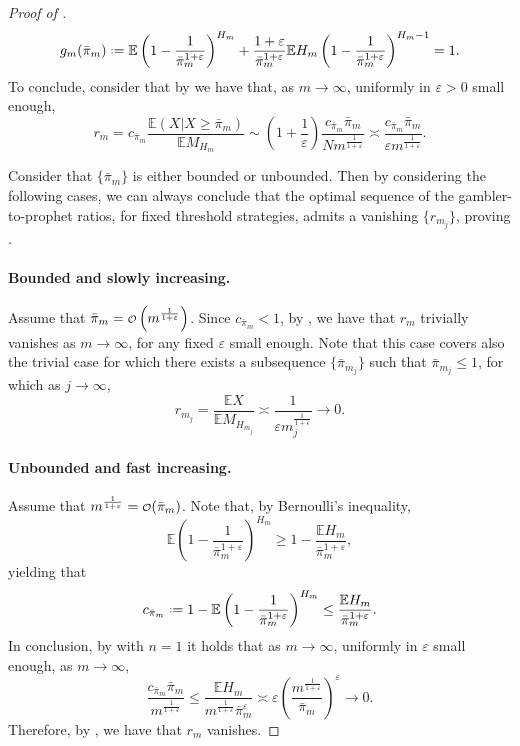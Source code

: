 \documentclass[11pt, a4paper, twoside]{article}
\newcommand\smallO{
	\mathchoice
	{{\scriptstyle\mathcal{O}}}{{\scriptstyle\mathcal{O}}}{{\scriptscriptstyle\mathcal{O}}}{\scalebox{.7}{$\scriptscriptstyle\mathcal{O}$}}}
\newcommand*{\defeq}{\mathrel{\vcenter{\baselineskip0.5ex \lineskiplimit0pt
			\hbox{\scriptsize.}\hbox{\scriptsize.}}}=}
\newcommand{\eps}{\varepsilon}
\newcommand{\EE}{\mathbb{E}}
\numberwithin{equation}{section}
\begin{document}
\begin{proof}[Proof of ]
		\begin{equation}\label{maxeq0}
			g_m(\bar{\pi}_m)\defeq\EE\left(1-\frac{1}{\bar{\pi}_m^{1+\eps}}\right)^{H_m}+\frac{1+\eps}{\bar{\pi}_m^{1+\eps}}\EE H_m\left(1-\frac{1}{\bar{\pi}_m^{1+\eps}}\right)^{H_m-1}=1.
		\end{equation}
		To conclude, consider that by  we have that, as $m\longrightarrow\infty$, uniformly in $\eps>0$ small enough,
		\begin{equation}\label{ratio}
			r_m=c_{\bar{\pi}_m} \frac{\EE(X|X\ge\bar{\pi}_m)}{\EE M_{H_m}}\sim\left(1+\frac{1}{\eps}\right)\frac{c_{\bar{\pi}_m} \bar{\pi}_m}{Nm^{\frac{1}{1+\eps}}}\asymp \frac{c_{\bar{\pi}_m} \bar{\pi}_m}{\eps m^{\frac{1}{1+\eps}}}.
		\end{equation}
		
        Consider that $\{\bar{\pi}_m\}$ is either bounded or unbounded. Then by considering the following cases, we can always conclude that the optimal sequence of the gambler-to-prophet ratios, for fixed threshold strategies, admits a vanishing $\{r_{m_j}\}$, proving .
		\paragraph{Bounded and slowly increasing.} Assume that $\bar{\pi}_m = \smallO\left(m^{\frac{1}{1+\eps}}\right)$. 
            Since $c_{\bar{\pi}_{m}}<1$, by , we have that $r_m$ trivially vanishes as $m\longrightarrow\infty$, for any fixed $\eps$ small enough. Note that this case covers also the trivial case for which there exists a subsequence $\{\bar{\pi}_{m_j}\}$ such that $\bar{\pi}_{m_j}\le1$, for which as $j\longrightarrow\infty$,
            \[
                r_{m_j}=\frac{\EE X}{\EE M_{H_{m_j}}}\asymp \frac{1}{\eps m_j^{\frac{1}{1+\eps}}} \longrightarrow 0.
            \]
          \paragraph{Unbounded and fast increasing.}
            Assume that $m^{\frac{1}{1+\eps}}=\smallO(\bar{\pi}_m)$. Note that, by Bernoulli's inequality, 
            \[
                \EE\left(1-\frac{1}{\bar{\pi}_{m}^{1+\eps}}\right)^{H_{m}}\ge1-\frac{\EE H_{m}}{\bar{\pi}_{m}^{1+\eps}},
            \]
    		yielding that \[c_{\bar{\pi}_{m}}\defeq1-\EE\left(1-\frac{1}{\bar{\pi}_{m}^{1+\eps}}\right)^{H_{m}}\le\frac{\EE H_{m}}{\bar{\pi}_{m}^{1+\eps}}.\]
    		In conclusion, by  with $n=1$ it holds that as $m\longrightarrow\infty$, uniformly in $\eps$ small enough, as $m\longrightarrow\infty$,
    		\[
                \frac{c_{\bar{\pi}_{m}} \bar{\pi}_{m}}{ m^{\frac{1}{1+\eps}}}\le \frac{\EE H_m}{ m^{\frac{1}{1+\eps}}\bar{\pi}_m^\eps}
                    \asymp \varepsilon\left(\frac{m^{\frac{1}{1+\eps}}}{\bar{\pi}_m}\right)^{\eps}
                    \longrightarrow 0.
            \]
    		Therefore, by , we have that $r_m$ vanishes.
      

\end{proof}
\end{document}
